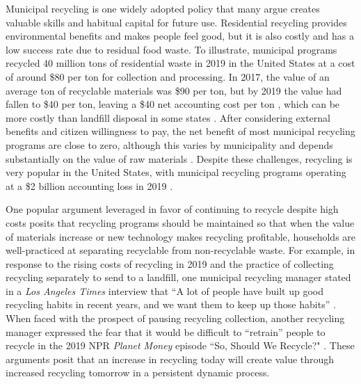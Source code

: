 \documentclass[12pt]{article}
\begin{document}
Municipal recycling is one widely adopted policy that many argue creates valuable skills and habitual capital for future use.  Residential recycling provides environmental benefits and makes people feel good, but it is also costly and has a low success rate due to residual food waste.  To illustrate, municipal programs recycled 40 million tons of residential waste in 2019 in the United States at a cost of around \$80 per ton for collection and processing. In 2017, the value of an average ton of recyclable materials was \$90 per ton, but by 2019 the value had fallen to \$40 per ton, leaving a \$40 net accounting cost per ton \citep{mouwetal2020}, which can be more costly than landfill disposal in some states \citep{kantnerstaley2019}.  After considering external benefits and citizen willingness to pay, the net benefit of most municipal recycling programs are close to zero, although this varies by municipality and depends substantially on the value of raw materials \citep{aadlandcaplan2006}. Despite these challenges, recycling is very popular in the United States, with municipal recycling programs operating at a \$2 billion accounting loss in 2019 \citep{mouwetal2020}.  

One popular argument leveraged in favor of continuing to recycle despite high costs posits that recycling programs should be maintained so that when the value of materials increase or new technology makes recycling profitable, households are well-practiced at separating recyclable from non-recyclable waste.  For example, in response to the rising costs of recycling in 2019 and the practice of collecting recycling separately to send to a landfill, one municipal recycling manager stated in a \textit{Los Angeles Times} interview that ``A lot of people have built up good recycling habits in recent years, and we want them to keep up those habits'' \citep{latimes2019}.  When faced with the prospect of pausing recycling collection, another recycling manager expressed the fear that it would be difficult to ``retrain'' people to recycle in the 2019 NPR \textit{Planet Money} episode ``So, Should We Recycle?" \citep{planetmoney2019}.  These arguments posit that an increase in recycling today will create value through increased recycling tomorrow in a persistent dynamic process.
\end{document}
